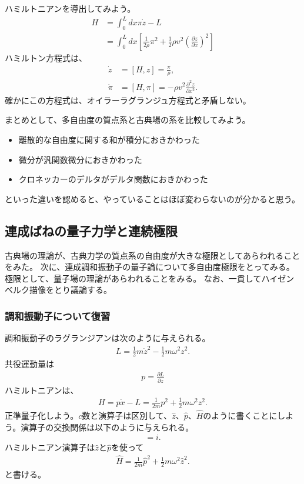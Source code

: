 \documentclass[10pt,a4paper]{jarticle}
\begin{document}
ハミルトニアンを導出してみよう。
\begin{align}
H
&= \int_0^L dx \pi \dot z - L \nonumber\\
&= \int_0^L dx \left[ \frac{1}{2\rho} \pi^2 + \frac{1}{2} \rho v^2 \left( \frac{\partial z}{\partial x} \right)^2 \right]
\end{align}
ハミルトン方程式は、
\begin{align}
\dot z &= [H, z] = \frac{\pi}{\rho}, \\
\dot \pi &= [H, \pi] = -\rho v^2 \frac{\partial^2 z}{\partial x^2}.
\end{align}
確かにこの方程式は、オイラーラグランジュ方程式と矛盾しない。

まとめとして、多自由度の質点系と古典場の系を比較してみよう。
\begin{itemize}
\item 離散的な自由度に関する和が積分におきかわった
\item 微分が汎関数微分におきかわった
\item クロネッカーのデルタがデルタ関数におきかわった
\end{itemize}
といった違いを認めると、やっていることはほぼ変わらないのが分かると思う。


\subsection{連成ばねの量子力学と連続極限}
古典場の理論が、古典力学の質点系の自由度が大きな極限としてあらわれることをみた。
次に、連成調和振動子の量子論について多自由度極限をとってみる。極限として、量子場の理論があらわれることをみる。
なお、一貫してハイゼンベルク描像をとり議論する。

\subsubsection{調和振動子について復習}
調和振動子のラグランジアンは次のように与えられる。
\begin{align}
L = \frac{1}{2} m\dot z^2 - \frac{1}{2} m \omega^2 z^2.
\end{align}
共役運動量は
\begin{align}
p = \frac{\partial L}{\partial \dot z}
\end{align}
ハミルトニアンは、
\begin{align}
H = p \dot x - L = \frac{1}{2m} p^2 + \frac{1}{2} m\omega^2 z^2.
\end{align}
%
正準量子化しよう。$c$数と演算子は区別して、$\hat z$、$\hat p$、$\hat H$のように書くことにしよう。演算子の交換関係は以下のように与えられる。
\begin{align}
[\hat z, \hat p] = i.
\end{align}
ハミルトニアン演算子は$\hat z$と$\hat p$を使って
\begin{align}
\hat H = \frac{1}{2m} \hat p^2 + \frac{1}{2} m\omega^2 \hat z^2. \label{eq:hamiltonian harmonic oscillator}
\end{align}
と書ける。
\end{document}
